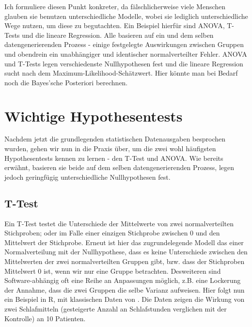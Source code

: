 \documentclass[a4paper,twoside]{tufte-book}\usepackage[]{graphicx}\usepackage[]{color}
\begin{document}
Ich formuliere diesen Punkt konkreter, da fälschlicherweise viele Menschen glauben sie benutzen unterschiedliche Modelle, wobei sie lediglich unterschiedliche Wege nutzen, um diese zu begutachten. Ein Beispiel hierfür sind ANOVA, T-Tests und die lineare Regression. Alle basieren auf ein und dem selben datengenerierenden Prozess - einige festgelegte Auswirkungen zwischen Gruppen und obendrein ein unabhängiger und identischer normalverteilter Fehler. ANOVA und T-Tests legen verschiedenste Nullhypothesen fest und die lineare Regression sucht nach dem Maximum-Likelihood-Schätzwert. Hier könnte man bei Bedarf noch die Bayes'sche Posteriori berechnen. 

\section{Wichtige Hypothesentests}

Nachdem jetzt die grundlegenden statistischen Datenausgaben besprochen wurden, gehen wir nun in die Praxis über, um die zwei wohl häufigsten Hypothesentests kennen zu lernen - den T-Test und ANOVA. Wie bereits erwähnt, basieren sie beide auf dem selben datengenerierenden Prozess, legen jedoch geringfügig unterschiedliche Nullhypothesen fest.

\subsection{T-Test}

Ein T-Test testet die Unterschiede der Mittelwerte von zwei normalverteilten Stichproben; oder im Falle einer einzigen Stichprobe zwischen 0 und den Mittelwert der Stichprobe. Erneut ist hier das zugrundelegende Modell das einer Normalverteilung mit der Nullhypothese, dass es keine Unterschiede zwischen den Mittelwerten der zwei normalverteilten Gruppen gibt, bzw. dass der Stichproben Mittelwert 0 ist, wenn wir nur eine Gruppe betrachten. Desweiteren sind Software-abhängig oft eine Reihe an Anpassungen möglich, z.B. eine Lockerung der Annahme, dass die zwei Gruppen die selbe Varianz aufweisen. Hier folgt nun ein Beispiel in R, mit klassischen Daten von \citet{Student-probableerrormean-1908}. Die Daten zeigen die Wirkung von zwei Schlafmitteln (gesteigerte Anzahl an Schlafstunden verglichen mit der Kontrolle) an 10 Patienten. 
\end{document}
